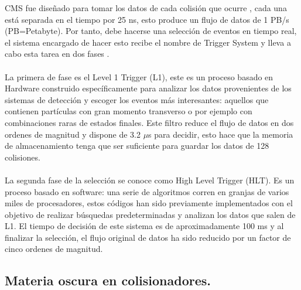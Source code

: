 CMS fue diseñado para tomar los datos de cada colisión que ocurre	, cada una está separada en el tiempo por 25 ns, esto produce un flujo de datos de 1 PB/s (PB=Petabyte). Por tanto, debe hacerse una selección de eventos en tiempo real, el sistema encargado de hacer esto recibe el nombre de Trigger System y lleva a cabo esta tarea en dos fases \cite{CMSTrigger}. 
\\
\\
La primera de fase es el Level 1 Trigger (L1), este es un proceso basado en Hardware construido específicamente para analizar los datos provenientes de los sistemas de detección y escoger los eventos más interesantes: aquellos que contienen partículas con gran momento transverso o por ejemplo con combinaciones raras de estados finales. Este filtro reduce el flujo de datos en dos ordenes de magnitud y dispone de 3.2 $\mu$s para decidir, esto hace que la memoria de almacenamiento tenga que ser suficiente para guardar los datos de 128  colisiones.
\\
\\
La segunda fase de la selección se conoce como High Level Trigger (HLT). Es un proceso basado en software: una serie de algoritmos corren en granjas de varios miles de procesadores, estos códigos han sido previamente implementados con el objetivo de realizar búsquedas predeterminadas y analizan los datos que salen de L1. El tiempo de decisión de este sistema es de aproximadamente 100 ms y al finalizar la selección, el flujo original de datos ha sido reducido por un factor de cinco ordenes de magnitud.

\subsection{Materia oscura en colisionadores.}

